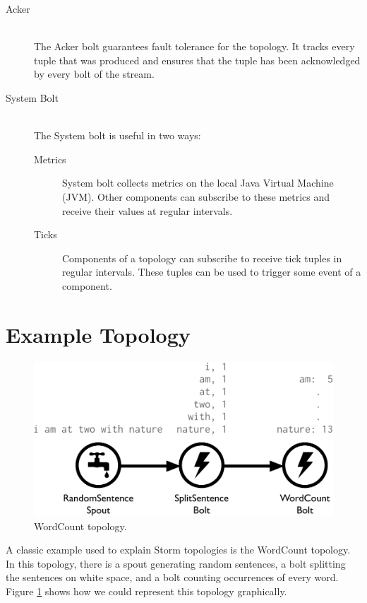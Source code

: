 \documentclass[bsc,twoside,singlespacing,normalheadings,parskip]{infthesis}\usepackage[]{graphicx}\usepackage[]{color}
\begin{document}
\begin{description}
	\item[Acker] \hfill \\
	The Acker bolt guarantees fault tolerance for the topology. It tracks every tuple that was produced and ensures that the tuple has been acknowledged by every bolt of the stream.
	\item[System Bolt] \hfill \\
	The System bolt is useful in two ways:
	\begin{description}
		\item[Metrics] System bolt collects metrics on the local Java Virtual Machine (JVM). Other components can subscribe to these metrics and receive their values at  regular intervals.
		\item[Ticks] Components of a topology can subscribe to receive tick tuples in regular intervals. These tuples can be used to trigger some event of a component.
	\end{description}
\end{description}

\section{Example Topology}
\label{sec:example_topology}

\begin{figure}[!htb]
	\centering
	\includegraphics[scale=0.475]{pdf/wordcount_topology.pdf}
	\caption{WordCount topology.}
	\label{fig:wordcount_topology}
\end{figure}

A classic example used to explain Storm topologies is the WordCount topology. In this topology, there is a spout generating random sentences, a bolt splitting the sentences on white space, and a bolt counting occurrences of every word. Figure \ref{fig:wordcount_topology} shows how we could represent this topology graphically.
\end{document}
